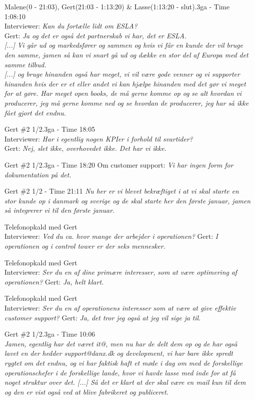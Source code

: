 \begin{thebibliography}{9}
	Malene(0 - 21:03), Gert(21:03 - 1:13:20) \& Lasse(1:13:20 - slut).3ga - Time 1:08:10\\
	Interviewer: \textit{Kan du fortælle lidt om ESLA?}\\
	Gert: \textit{Ja og det er også det partnerskab vi har, det er ESLA.}\\
	\textit{[...] Vi går ud og markedsfører og sammen og hvis vi får en kunde der vil bruge den samme, jamen så kan vi snart gå ud og dække en stor del af Europa med det samme tilbud.}\\
	\textit{[...] og bruge hinanden også har meget, vi vil være gode venner og vi supporter hinanden hvis der er et eller andet vi kan hjælpe hinanden med det gør vi meget for at gøre. Har meget open books, de må gerne komme op og se alt hvordan vi producerer, jeg må gerne komme ned og se hvordan de producerer, jeg har så ikke fået gjort det endnu.}

	Gert \#2 1/2.3ga - Time 18:05\\
	Interviewer: \textit{Har i egentlig nogen KPIer i forhold til svartider?}\\
	Gert: \textit{Nej, slet ikke, overhovedet ikke. Det har vi ikke.}

	Gert \#2 1/2.3ga - Time 18:20
	Om customer support: 
	\textit{Vi har ingen form for dokumentation på det.}

	Gert \#2 1/2 - Time 21:11
	\textit{Nu her er vi blevet bekræftiget i at vi skal starte en stor kunde op i danmark og sverige og de skal starte her den første januar, jamen så integrerer vi til den første januar.}

	Telefonopkald med Gert\\
	Interviewer: \textit{Ved du ca. hvor mange der arbejder i operationen?}
	 Gert: \textit{I operationen og i control tower er der seks mennesker.}

	Telefonopkald med Gert\\
	Interviewer: \textit{Ser du en af dine primære interesser, som at være optimering af operationen?} Gert: \textit{Ja, helt klart.}

	Telefonopkald med Gert\\
	Interviewer: \textit{Ser du en af operationens interesser som at være at give effektiv customer support?} Gert: \textit{Ja, det tror jeg også at jeg vil sige ja til.}

	Gert \#2 1/2.3ga - Time 10:06\\
	\textit{Jamen, egentlig har det været it@, men nu har de delt dem op og de har også lavet en der hedder support@danx.dk og development, vi har bare ikke spredt rygtet om det endnu, og vi har faktisk haft et møde i dag om med de forskellige operationschefer i de forskellige lande, hvor vi havde lasse med inde for at få noget struktur over det. [...] Så det er klart at der skal være en mail kun til dem og den er vist også ved at blive fabrikeret og publiceret. }


\end{thebibliography}
